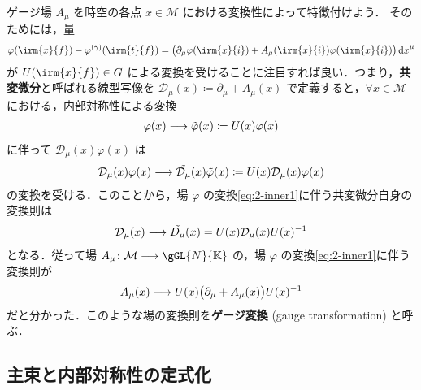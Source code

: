 \documentclass[TQFT_main]{subfiles}
\begin{document}
ゲージ場 $A_\mu$ を時空の各点 $x \in \mathcal{M}$ における変換性によって特徴付けよう．
そのためには，量
\begin{align}
    \varphi (\irm{x}{f}) - \varphi^{(\gamma)}(\irm{t}{f}) = \bigl( \partial_\mu \varphi (\irm{x}{i}) + A_\mu(\irm{x}{i}) \varphi (\irm{x}{i}) \bigr) \dd{x}^\mu
\end{align}
が $U(\irm{x}{f}) \in G$ による変換を受けることに注目すれば良い．つまり，\textbf{共変微分}と呼ばれる線型写像を $\mathcal{D}_\mu (x) \coloneqq \partial_\mu + A_\mu (x)$ で定義すると，$\forall x \in \mathcal{M}$ における，内部対称性による変換
\begin{align}
    \label{eq:2-inner1}
    \varphi(x) \longrightarrow \tilde{\varphi}(x) \coloneqq U(x) \varphi (x)
\end{align}
に伴って $\mathcal{D}_\mu (x) \varphi (x)$ は
\begin{align}
    \mathcal{D}_\mu(x) \varphi(x) \longrightarrow \tilde{\mathcal{D}_\mu} (x) \tilde{\varphi}(x) \coloneqq U(x) \mathcal{D}_\mu (x) \varphi(x)
\end{align}
の変換を受ける．このことから，場 $\varphi$ の変換\eqref{eq:2-inner1}に伴う共変微分自身の変換則は
\begin{align}
    \label{eq:def-codv-transform}
    \mathcal{D}_\mu (x) \longrightarrow \tilde{D_\mu} (x) = U(x) \mathcal{D}_\mu (x) U(x)^{-1}
\end{align}
となる．従って場 $A_\mu \colon \mathcal{M} \lto \gGL{N}{\mathbb{K}}$ の，場 $\varphi$ の変換\eqref{eq:2-inner1}に伴う変換則が
\begin{align}
    \label{eq:def-gauge-transform}
    A_\mu (x) \longrightarrow U(x)\bigl(\partial_\mu + A_\mu(x) \bigr) U(x)^{-1}
\end{align}
だと分かった．このような場の変換則を\textbf{ゲージ変換} (gauge transformation) と呼ぶ．
    

\subsection{主束と内部対称性の定式化}
\end{document}
